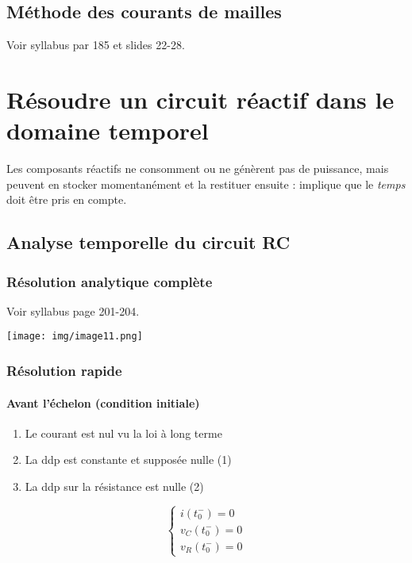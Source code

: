 \documentclass	[11pt, a4paper, openany]{book}
\begin{document}
\section{Méthode des courants de mailles}
Voir syllabus par 185 et slides 22-28.
\chapter{Résoudre un circuit réactif dans le domaine temporel}
Les composants réactifs ne consomment ou ne génèrent pas de puissance, mais peuvent en stocker momentanément et la restituer ensuite : implique que le \textit{temps} doit être pris en compte.

\setcounter{section}{1}
\section{Analyse temporelle du circuit RC}
\subsection{Résolution analytique complète}
Voir syllabus page 201-204.
\begin{center}
\texttt{[image: img/image11.png]}
\end{center}

\subsection{Résolution rapide}
\subsubsection{Avant l'échelon (condition initiale)}
\begin{enumerate}
\item Le courant est nul vu la loi à long terme
\item La ddp est constante et supposée nulle (1)
\item La ddp sur la résistance est nulle (2)
\end{enumerate}
\begin{equation}
\left\{\begin{array}{l}
i(t_0^-) = 0\\
v_C(t_0^-) = 0\\
v_R(t_0^-) = 0
\end{array}\right.
\end{equation}
\end{document}
